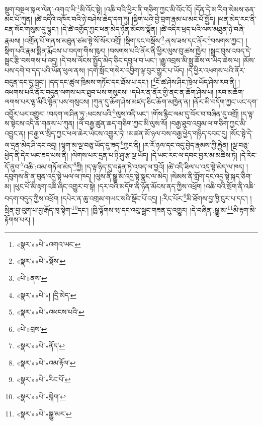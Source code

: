 སྡུག་བསྔལ་སྐལ་ལེན་:འགའ་ཡི་\footnote{«སྣར་»«པེ་»འགའ་ཡང་}མི་འོང་སྟེ། །འཆི་བའི་ཕྱིར་ནི་གཅིག་ཀྱང་མི་འོང་ངོ། །དོན་དེ་མ་རིག་སེམས་ཅན་མང་པོ་ཀུན། །ཚེ་འདིའི་འཁོར་བའི་ཉེ་བཤེས་ཆེད་དག་ཏུ། །སྡིག་པའི་བྱེ་བྲག་རྣམ་པ་མང་པོ་སྤྱོད། །ཕན་མེད་རང་ནི་ངན་སོང་གསུམ་དུ་ལྟུང་། །དེ་ཚེ་འགྱོད་ཀྱང་ཕན་མེད་ཉོན་མོངས་སྣོན། །ཚེ་འདིར་ཕྲད་པའི་ལས་མཐུན་ཉེ་བཞི་རྣམས། །འགྲོན་པོ་གནས་མཐུན་ཙམ་སྟེ་སོ་སོར་འགྲོ། །སྡིག་དང་བསྡོས་\footnote{«སྣར་»«པེ་»སྡོས་}:ནས་ཟས་དང་ནོར་\footnote{«པེ་»ནས་}བསགས་ཀྱང་། །སྡིག་པའི་རྣམ་སྨིན་རྨོངས་པ་བདག་གིས་ཁུར། །བསགས་པའི་ནོར་ནི་ཕྱིར་ལུས་བུ་ཚས་ཁྱེར། །སྦྲང་བུས་འབད་དེ་སྦྲང་རྩི་བསགས་པ་འདྲ། །དེ་བས་ལོངས་སྤྱོད་མེད་ཅིང་དབུལ་བ་ཡང་། །རྒྱུ་འབྲས་མི་སླུ་ཆོས་ལ་ཡིད་ཆེས་པ། །མོས་པས་དགེ་བ་དད་པའི་ཡོན་ཕུལ་ནས། །དགེ་སློང་གསེར་འབྱིག་ལྟ་བུར་གྱུར་པ་ཡོད། །དེ་ཕྱིར་འཕགས་པའི་ནོར་བདུན་དང་དུ་བླང་། །དད་དང་ཚུལ་ཁྲིམས་གཏོང་དང་ཐོས་པ་དང་། །\footnote{«སྣར་»«པེ་»། །དྲི་མེད་}ངོ་ཚ་ཤེས་ཤིང་ཁྲེལ་ཡོད་ཤེས་རབ་ནི། །འཕགས་པའི་ནོར་བདུན་ལགས་པར་ཐུབ་པས་གསུངས། །དཔེར་ན་ནོར་གྱི་ནང་ན་ཆོག་ཤེས་པ། །རབ་མཆོག་ལགས་པར་ལྷ་མིའི་སྟོན་པས་གསུངས། །ཀུན་དུ་ཆོག་ཤེས་མཛད་ཅིང་ཆོག་མཁྱེན་ན། །ནོར་མི་བདོག་ཀྱང་ཡང་དག་འབྱོར་པར་འགྱུར། །བདག་ལ་ཤིན་ཏུ་:ཕངས་པའི་\footnote{«སྣར་»«པེ་»འཕངས་པའི་}ལུས་འདི་ཡང་། །གོས་རྙིང་ལམ་དུ་བོར་བ་བཞིན་དུ་འགྲོ། །ད་ལྟ་ས་སྟེངས་འདི་ན་གནས་པ་ཀུན། །ལོ་བརྒྱ་ཚུན་ཆད་གཅིག་ཀྱང་མི་ལུས་སོ། །བརྒྱ་ཐུབ་འབུམ་ལ་གཅིག་ཀྱང་མི་འབྱུང་ན། །བརྒྱ་ལ་སྲིད་ཀྱང་ཕལ་ཆེར་ཡེངས་འགྱུར་ཏེ། །མཚན་མོ་ཉལ་བས་བརྒྱ་ཕྱེད་གཉིད་དབང་དུ། །སོང་སྟེ་དེ་ལ་དྲན་མེད་ཤི་དང་འདྲ། །ལྷག་མ་ལྔ་བཅུ་ཡོད་དུ་ཟད་\footnote{«པེ་»བྲས་}ཀྱང་ནི། །ར་རོ་ཉལ་དང་འདུ་བྱེད་རྣམས་ཀྱི་རྐྱེན། །ལྔ་བཅུ་ཕྱེད་ནི་དེར་ཡང་ཟད་པས་ནི། །ལེགས་པར་དྲན་པ་ཉི་ཤུ་རྩ་ལྔ་ཡོད། །དེ་ཡང་རང་ལ་དབང་བྱར་མ་མཆིས་ཏེ། །དེ་རིང་དོ་ནུབ་\footnote{«སྣར་»«པེ་»ནོད་}འཆི་:འམ་གཏོལ་མེད་\footnote{«སྣར་»«པེ་»འམ་རྟོལ་}ཀྱི། །ད་ལྟ་ཉིད་དུ་བརྟུན་ཏེ་འབད་ལ་བྱའོ། །ཚེ་འདི་ཟིལ་པ་འདྲ་སྟེ་མེད་ལ་ཁད། །དབུགས་ནི་ན་བུན་འདྲ་སྟེ་ཡལ་ལ་ཁད། །ལུས་ནི་སྒྱུ་མ་འདྲ་སྟེ་སྣང་ལ་མེད། །སེམས་ནི་གློག་དང་འདྲ་སྟེ་སྐད་ཅིག་མ། །ཕུང་པོ་མི་རྟག་འཆི་ཞིང་འགྱུར་བ་སྟེ། །དར་བའི་མདོག་ནི་ཉོན་མོངས་ནད་ཀྱིས་འཕྲོག །འཆི་བའི་སྲོག་ནི་འཆི་བདག་བདུད་ཀྱིས་འཕྲོག །དཔེར་ན་ཆུ་འགྲམ་གཡང་སའི་སྡོང་པོ་འདྲ། །:རིང་པོར་\footnote{«སྣར་»«པེ་»རིང་པོ་}མི་ཐོགས་བྱ་ཁྱི་ངུར་པ་དང་། །སྲིན་བྱ་འུག་པ་བྱ་རྒོད་ཁྭ་སྟེག་\footnote{«སྣར་»«པེ་»སྐེག་}དང་། །ཁྱི་ལྟོགས་ཝ་དང་འབུ་སྦྲང་གཟན་དུ་འགྱུར། །དེ་བཞིན་:སྒྱུ་མ་\footnote{«སྣར་»«པེ་»སྒྱུ་མར་}མི་རྟག་མི་རྟོགས་པར། །
